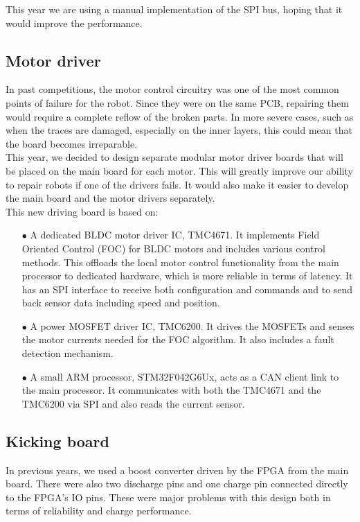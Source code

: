 \documentclass[runningheads]{llncs}
\begin{document}
This year we are using a manual implementation of the SPI bus, hoping that it would improve the performance. 

\subsection{Motor driver}
In past competitions, the motor control circuitry was one of the most common points of failure for the robot. Since they were on the same PCB, repairing them would require a complete reflow of the broken parts. In more severe cases, such as when the traces are damaged, especially on the inner layers, this could mean that the board becomes irreparable.\\
This year, we decided to design separate modular motor driver boards that will be placed on the main board for each motor. This will greatly improve our ability to repair robots if one of the drivers fails. It would also make it easier to develop the main board and the motor drivers separately.\\
This new driving board is based on:
\begin{enumerate}
    \item[$\bullet$] A dedicated BLDC motor driver IC, TMC4671. It implements Field Oriented Control (FOC) for BLDC motors and includes various control methods. This offloads the local motor control functionality from the main processor to dedicated hardware, which is more reliable in terms of latency. It has an SPI interface to receive both configuration and commands and to send back sensor data including speed and position.
    \item[$\bullet$] A power MOSFET driver IC, TMC6200. It drives the MOSFETs and senses the motor currents needed for the FOC algorithm. It also includes a fault detection mechanism.
    \item[$\bullet$] A small ARM processor, STM32F042G6Ux, acts as a CAN client link to the main processor. It communicates with both the TMC4671 and the TMC6200 via SPI and also reads the current sensor.
\end{enumerate}

\subsection{Kicking board}
In previous years, we used a boost converter driven by the FPGA from the main board. There were also two discharge pins and one charge pin connected directly to the FPGA's IO pins. These were major problems with this design both in terms of reliability and charge performance.\\
\end{document}
